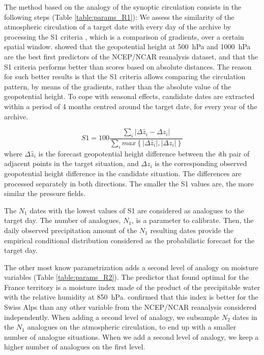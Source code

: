 \documentclass[twocol]{ametsoc}
\begin{document}
The method based on the analogy of the synoptic circulation consists in the following steps (Table \ref{table:params_R1}): We assess the similarity of the atmospheric circulation of a target date with every day of the archive by processing the S1 criteria \citep[Eq.\ (\ref{eq:S1}), ][]{Teweles1954, Drosdowsky2003}, which is a comparison of gradients, over a certain spatial window. \citet{Bontron2005} showed that the geopotential height at 500~hPa and 1000~hPa are the best first predictors of the NCEP/NCAR reanalysis dataset, and that the S1 criteria performs better than scores based on absolute distances. The reason for such better results is that the S1 criteria allows comparing the circulation pattern, by means of the gradients, rather than the absolute value of the geopotential height. To cope with seasonal effects, candidate dates are extracted within a period of 4 months centred around the target date, for every year of the archive.

\begin{equation}
\label{eq:S1}
S1=100 \frac {\displaystyle \sum_{i} \vert \Delta\hat{z}_{i} - \Delta z_{i} \vert}
{\displaystyle \sum_{i} max\left\lbrace \vert \Delta\hat{z}_{i} \vert , \vert \Delta z_{i} \vert \right\rbrace }
\end{equation}
where $\Delta \hat{z}_{i}$ is the forecast geopotential height difference between the \textit{i}th pair of adjacent points in the target situation, and $\Delta z_{i}$ is the corresponding observed geopotential height difference in the candidate situation. The differences are processed separately in both directions. The smaller the S1 values are, the more similar the pressure fields.

The $N_{1}$ dates with the lowest values of S1 are considered as analogues to the target day. The number of analogues, $N_{1}$, is a parameter to calibrate. Then, the daily observed precipitation amount of the $N_{1}$ resulting dates provide the empirical conditional distribution considered as the probabilistic forecast for the target day.

The other most know parametrization adds a second level of analogy on moisture variables (Table \ref{table:params_R2}). The predictor that \citet{Bontron2004} found optimal for the France territory is a moisture index made of the product of the precipitable water with the relative humidity at 850~hPa. \cite{Horton2012a} confirmed that this index is better for the Swiss Alps than any other variable from the NCEP/NCAR reanalysis considered independently. When adding a second level of analogy, we subsample $N_{2}$ dates in the $N_{1}$ analogues on the atmospheric circulation, to end up with a smaller number of analogue situations. When we add a second level of analogy, we keep a higher number of analogues on the first level.
\end{document}
